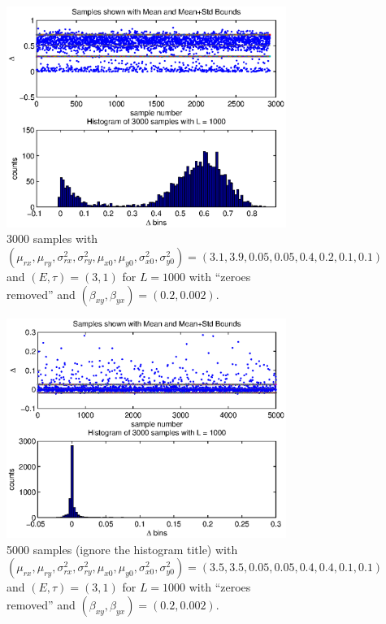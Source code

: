 \documentclass[a4paper,11pt]{article}
\begin{document}
\begin{figure}[h!t]
\centering
\centering
\begin{subfigure}[b]{0.4\textwidth}
\label{fig:TwoPopDynSampFig2}
\includegraphics[scale=0.55]{graphics/TwoPopDynSampFig2.eps}
\caption{3000 samples with $\left(\mu_{rx},\mu_{ry},\sigma^2_{rx},\sigma^2_{ry},\mu_{x0},\mu_{y0},\sigma^2_{x0},\sigma^2_{y0}\right) = \left(3.1,3.9,0.05,0.05,0.4,0.2,0.1,0.1\right)$ and $\left(E,\tau\right)=\left(3,1\right)$ for $L=1000$ with ``zeroes removed'' and $(\beta_{xy},\beta_{yx})=(0.2,0.002)$.}
\end{subfigure}
\begin{subfigure}[b]{0.4\textwidth}
\label{fig:TwoPopDynSampFig3}
\includegraphics[scale=0.55]{graphics/TwoPopDynSampFig3.eps}
\caption{5000 samples (ignore the histogram title) with $\left(\mu_{rx},\mu_{ry},\sigma^2_{rx},\sigma^2_{ry},\mu_{x0},\mu_{y0},\sigma^2_{x0},\sigma^2_{y0}\right) = \left(3.5,3.5,0.05,0.05,0.4,0.4,0.1,0.1\right)$ and $\left(E,\tau\right)=\left(3,1\right)$ for $L=1000$ with ``zeroes removed'' and $(\beta_{xy},\beta_{yx})=(0.2,0.002)$.}
\end{subfigure}
\caption{}
\end{figure}
\end{document}
